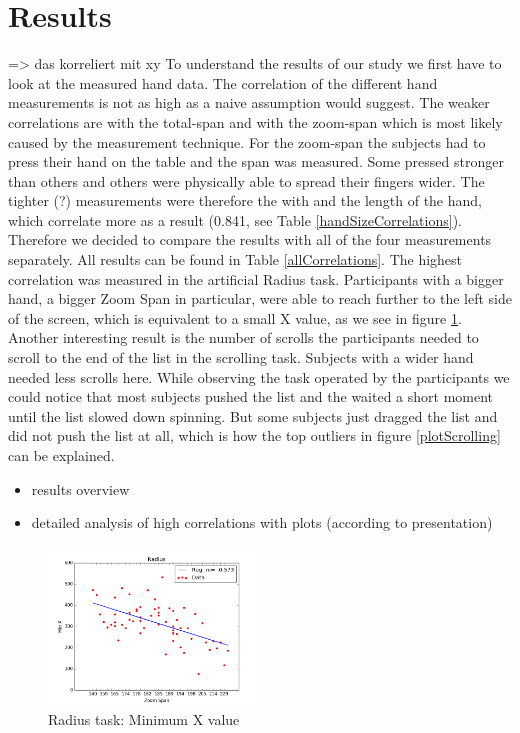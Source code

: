 \documentclass{sigchi}
\begin{document}
\section{Results}
=> das korreliert mit xy
To understand the results of our study we first have to look at the measured hand data. The correlation of the different hand measurements is not as high as a naive assumption would suggest. The weaker correlations are with the total-span and with the zoom-span which is most likely caused by the measurement technique. For the zoom-span the subjects had to press their hand on the table and the span was measured. Some pressed stronger than others and others were physically able to spread their fingers wider. The tighter (?) measurements were therefore the with and the length of the hand, which correlate more as a result (0.841, see Table \ref{handSizeCorrelations}). Therefore we decided to compare the results with all of the four measurements separately. All results can be found in Table \ref{allCorrelations}. The highest correlation was measured in the artificial Radius task. Participants with a bigger hand, a bigger Zoom Span in particular, were able to reach further to the left side of the screen, which is equivalent to a small X value, as we see in figure \ref{plotRadius}.
Another interesting result is the number of scrolls the participants needed to scroll to the end of the list in the scrolling task. Subjects with a wider hand needed less scrolls here. While observing the task operated by the participants we could notice that most subjects pushed the list and the waited a short moment until the list slowed down spinning. But some subjects just dragged the list and did not push the list at all, which is how the top outliers in figure \ref{plotScrolling} can be explained.
\begin{itemize}
\item results overview
\item detailed analysis of high correlations with plots (according to presentation)
\end{itemize}


\begin{figure}[ht]
	\centering
  \includegraphics[width=0.5\textwidth]{figures/plotRadius.png}
	\caption{Radius task: Minimum X value}
	\label{plotRadius}
\end{figure}
\end{document}
